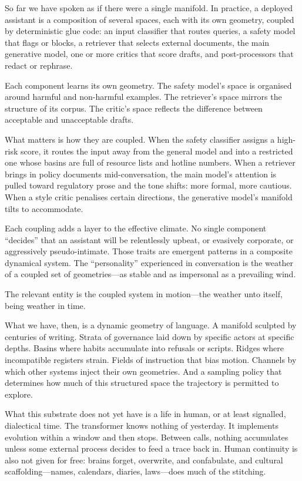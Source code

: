 So far we have spoken as if there were a single manifold. In practice, a deployed assistant is a composition of several spaces, each with its own geometry, coupled by deterministic glue code: an input classifier that routes queries, a safety model that flags or blocks, a retriever that selects external documents, the main generative model, one or more critics that score drafts, and post-processors that redact or rephrase.

Each component learns its own geometry. The safety model's space is organised around harmful and non-harmful examples. The retriever's space mirrors the structure of its corpus. The critic's space reflects the difference between acceptable and unacceptable drafts.

What matters is how they are coupled. When the safety classifier assigns a high-risk score, it routes the input away from the general model and into a restricted one whose basins are full of resource lists and hotline numbers. When a retriever brings in policy documents mid-conversation, the main model's attention is pulled toward regulatory prose and the tone shifts: more formal, more cautious. When a style critic penalises certain directions, the generative model's manifold tilts to accommodate.

Each coupling adds a layer to the effective climate. No single component ``decides'' that an assistant will be relentlessly upbeat, or evasively corporate, or aggressively pseudo-intimate. Those traits are emergent patterns in a composite dynamical system. The ``personality'' experienced in conversation is the weather of a coupled set of geometries---as stable and as impersonal as a prevailing wind.

The relevant entity is the coupled system in motion---the weather unto itself, being weather in time.

\bigskip

What we have, then, is a dynamic geometry of language. A manifold sculpted by centuries of writing. Strata of governance laid down by specific actors at specific depths. Basins where habits accumulate into refusals or scripts. Ridges where incompatible registers strain. Fields of instruction that bias motion. Channels by which other systems inject their own geometries. And a sampling policy that determines how much of this structured space the trajectory is permitted to explore.

What this substrate does not yet have is a life in human, or at least signalled, dialectical time. The transformer knows nothing of yesterday. It implements evolution within a window and then stops. Between calls, nothing accumulates unless some external process decides to feed a trace back in. Human continuity is also not given for free: brains forget, overwrite, and confabulate, and cultural scaffolding---names, calendars, diaries, laws---does much of the stitching.


